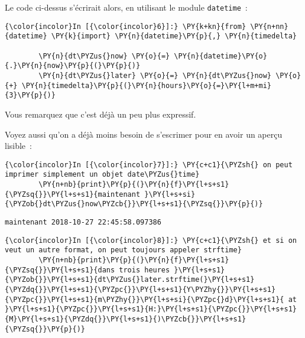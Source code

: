    Le code ci-dessus s'écrirait alors, en utilisant le module
\texttt{datetime}~:

    \begin{Verbatim}[commandchars=\\\{\},frame=single,framerule=0.3mm,rulecolor=\color{cellframecolor}]
{\color{incolor}In [{\color{incolor}6}]:} \PY{k+kn}{from} \PY{n+nn}{datetime} \PY{k}{import} \PY{n}{datetime}\PY{p}{,} \PY{n}{timedelta}
        
        \PY{n}{dt\PYZus{}now} \PY{o}{=} \PY{n}{datetime}\PY{o}{.}\PY{n}{now}\PY{p}{(}\PY{p}{)}
        \PY{n}{dt\PYZus{}later} \PY{o}{=} \PY{n}{dt\PYZus{}now} \PY{o}{+} \PY{n}{timedelta}\PY{p}{(}\PY{n}{hours}\PY{o}{=}\PY{l+m+mi}{3}\PY{p}{)}
\end{Verbatim}


    Vous remarquez que c'est déjà un peu plus expressif.

Voyez aussi qu'on a déjà moins besoin de s'escrimer pour en avoir un
aperçu lisible~:

    \begin{Verbatim}[commandchars=\\\{\},frame=single,framerule=0.3mm,rulecolor=\color{cellframecolor}]
{\color{incolor}In [{\color{incolor}7}]:} \PY{c+c1}{\PYZsh{} on peut imprimer simplement un objet date\PYZus{}time}
        \PY{n+nb}{print}\PY{p}{(}\PY{n}{f}\PY{l+s+s1}{\PYZsq{}}\PY{l+s+s1}{maintenant }\PY{l+s+si}{\PYZob{}dt\PYZus{}now\PYZcb{}}\PY{l+s+s1}{\PYZsq{}}\PY{p}{)}
\end{Verbatim}


    \begin{Verbatim}[commandchars=\\\{\},frame=single,framerule=0.3mm,rulecolor=\color{cellframecolor}]
maintenant 2018-10-27 22:45:58.097386
\end{Verbatim}

    \begin{Verbatim}[commandchars=\\\{\},frame=single,framerule=0.3mm,rulecolor=\color{cellframecolor}]
{\color{incolor}In [{\color{incolor}8}]:} \PY{c+c1}{\PYZsh{} et si on veut un autre format, on peut toujours appeler strftime}
        \PY{n+nb}{print}\PY{p}{(}\PY{n}{f}\PY{l+s+s1}{\PYZsq{}}\PY{l+s+s1}{dans trois heures }\PY{l+s+s1}{\PYZob{}}\PY{l+s+s1}{dt\PYZus{}later.strftime(}\PY{l+s+s1}{\PYZdq{}}\PY{l+s+s1}{\PYZpc{}}\PY{l+s+s1}{Y\PYZhy{}}\PY{l+s+s1}{\PYZpc{}}\PY{l+s+s1}{m\PYZhy{}}\PY{l+s+si}{\PYZpc{}d}\PY{l+s+s1}{ at }\PY{l+s+s1}{\PYZpc{}}\PY{l+s+s1}{H:}\PY{l+s+s1}{\PYZpc{}}\PY{l+s+s1}{M}\PY{l+s+s1}{\PYZdq{}}\PY{l+s+s1}{)\PYZcb{}}\PY{l+s+s1}{\PYZsq{}}\PY{p}{)}
\end{Verbatim}


